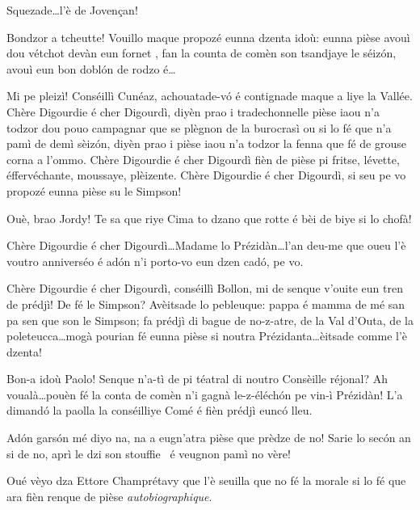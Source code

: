 \begin{drama}
\Cimaspeaks {} Squezade\ldots l'è de Jovençan!

\Richardspeaks Bondzor a tcheutte! Vouillo maque propozé eunna dzen\-ta idoù: eunna pièse avouì dou vétchot devàn eun fornet \fornet, fan la counta de comèn son tsandjaye le séiz\'on, avouì eun bon dobl\'on de rodzo é\ldots

\Jordyspeaks {} Mi pe pleizì! Conséillì Cunéaz, a\-chou\-a\-ta\-de-v\'o é contignade maque a liye la Vallée. Chère Digourdie é cher Digourdì, diyèn prao i tradechonnelle pièse iaou n'a todzor dou pouo campagnar que se plègnon de la burocrasì ou si lo fé que n'a pamì de demì sèiz\'on, diyèn prao i pièse iaou n'a to\-dzor la fenna que fé de grouse corna a l'ommo. Chère Digourdie é cher Digourdì fièn de pièse pi fritse, lévette, éffervéchante, moussaye, plèizente. Chère Digourdie é cher Digourdì, si seu pe vo propozé eunna pièse su le Simpson\homer !

\Marcospeaks Ouè, brao Jordy! Te sa que riye Cima to dzano que rotte é bèi de biye si lo chofà!

\Dallasspeaks Chère Digourdie é cher Digourdì\ldots Madame lo Prézidàn\ldots l'an deu-me que oueu l'è voutro anniverséo é ad\'on n'i porto-vo eun dzen cad\'o, pe vo.


\Dallasspeaks Chère Digourdie é cher Digourdì, conséillì Bollon, mi de senque v'ouite eun tren de prédjì! De fé le Simpson? Avè\-i\-tsade lo pebleuque: pappa é mamma de mé san pa sen que son le Simpson; fa prédjì di bague de no-z-atre, de la Val d'Outa, de la poleteucca\ldots mogà pourian fé eunna pièse si noutra Prézidanta\ldots èitsade comme l'è dzenta!

\Presidanspeaks Bon-a idoù Paolo! Senque n'a-tì de pi téatral di noutro Con\-sè\-ille réjonal? Ah voualà\ldots pouèn fé la conta de comèn n'i gagnà le-z-éléch\'on pe vin-ì Prézidàn!  L’a dimand\'o la paolla la conséilliye Comé é fièn prédjì eunc\'o lleu.

\Sophiespeaks Ad\'on gars\'on mé diyo na, na a eugn'atra pièse que prèdze de no! Sarie lo sec\'on an si de no, aprì le dzi son stouffie \stufo\ é veugnon pamì no vère!

\Cimaspeaks Oué vèyo dza Ettore Champrétavy que l'è seuilla  que no fé la morale si lo fé que ara fièn renque de pièse \textit{autobiographique}.


\end{drama}

